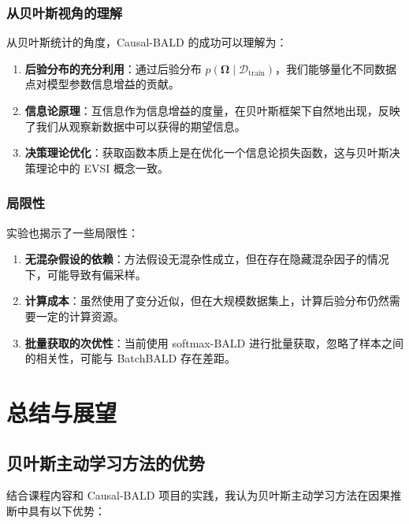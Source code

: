 \documentclass[12pt]{article}
\begin{document}
\subsubsection{从贝叶斯视角的理解}

从贝叶斯统计的角度，Causal-BALD 的成功可以理解为：
\begin{enumerate}
\item \textbf{后验分布的充分利用}：通过后验分布 $p(\boldsymbol{\Omega} \mid \mathcal{D}_{\text{train}})$，我们能够量化不同数据点对模型参数信息增益的贡献。

\item \textbf{信息论原理}：互信息作为信息增益的度量，在贝叶斯框架下自然地出现，反映了我们从观察新数据中可以获得的期望信息。

\item \textbf{决策理论优化}：获取函数本质上是在优化一个信息论损失函数，这与贝叶斯决策理论中的 EVSI 概念一致。
\end{enumerate}

\subsubsection{局限性}

实验也揭示了一些局限性：
\begin{enumerate}
\item \textbf{无混杂假设的依赖}：方法假设无混杂性成立，但在存在隐藏混杂因子的情况下，可能导致有偏采样。

\item \textbf{计算成本}：虽然使用了变分近似，但在大规模数据集上，计算后验分布仍然需要一定的计算资源。

\item \textbf{批量获取的次优性}：当前使用 softmax-BALD 进行批量获取，忽略了样本之间的相关性，可能与 BatchBALD 存在差距。
\end{enumerate}

\section{总结与展望}

\subsection{贝叶斯主动学习方法的优势}

结合课程内容和 Causal-BALD 项目的实践，我认为贝叶斯主动学习方法在因果推断中具有以下优势：
\end{document}
